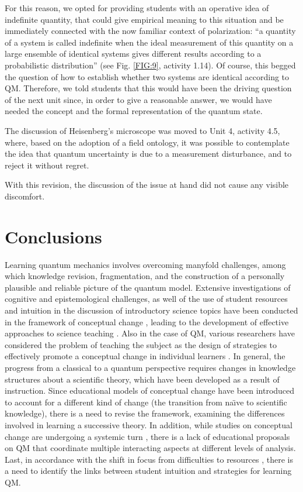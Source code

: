 \documentclass[twocolumn,secnumarabic,amssymb, nobibnotes, aps, prd, nofootinbib]{revtex4-2}
\begin{document}
For this reason, we opted for providing students with an operative idea of indefinite quantity, that could give empirical meaning to this situation and be immediately connected with the now familiar context of polarization: ``a quantity of a system is called indefinite when the ideal measurement of this quantity on a large ensemble of identical systems gives different results according to a probabilistic distribution'' (see Fig. \ref{FIG:9}, activity 1.14). Of course, this begged the question of how to establish whether two systems are identical according to QM. Therefore, we told students that this would have been the driving question of the next unit since, in order to give a reasonable answer, we would have needed the concept and the formal representation of the quantum state.

The discussion of Heisenberg's microscope was moved to Unit 4, activity 4.5, where, based on the adoption of a field ontology, it was possible to contemplate the idea that quantum uncertainty is due to a measurement disturbance, and to reject it without regret.

With this revision, the discussion of the issue at hand did not cause any visible discomfort.


\section{Conclusions}

Learning quantum mechanics involves overcoming manyfold challenges, among which knowledge revision, fragmentation, and the construction of a personally plausible and reliable picture of the quantum model. Extensive investigations of cognitive and epistemological challenges, as well of the use of student resources and intuition in the discussion of introductory science topics have been conducted in the framework of conceptual change \cite{Vosniadou2008, diSessa2014}, leading to the development of effective approaches to science teaching \cite{Amin2014}. Also in the case of QM, various researchers have considered the problem of teaching the subject as the design of strategies to effectively promote a conceptual change in individual learners \cite[e.g.,][]{Thagard1992, Kalkanis2003, Tsaparlis2013, Malgieri2017}. In general, the progress from a classical to a quantum perspective requires changes in knowledge structures about a scientific theory, which have been developed as a result of instruction. Since educational models of conceptual change have been introduced to account for a different kind of change (the transition from na\"{\i}ve to scientific knowledge), there is a need to revise the framework, examining the differences involved in learning a successive theory. In addition, while studies on conceptual change are undergoing a systemic turn \cite{Amin2014}, there is a lack of educational proposals on QM that coordinate multiple interacting aspects at different levels of analysis. Last, in accordance with the shift in focus from difficulties to resources \cite{Goodhew2019}, there is a need to identify the links between student intuition and strategies for learning QM.
\end{document}
